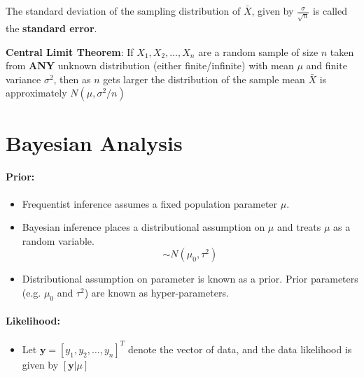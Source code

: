 \documentclass{article}
\begin{document}
The standard deviation of the sampling distribution of $\bar{X}$, given by $\frac{\sigma}{\sqrt{n}}$ is called the \textbf{standard error}.

\textbf{Central Limit Theorem}: If $X_1,X_2,\ldots,X_n$ are a random sample of size $n$ taken from \textbf{ANY} unknown distribution (either finite/infinite) with mean $\mu$ and finite variance $\sigma^2$, then as $n$ gets larger the distribution of the sample mean $\bar{X}$ is approximately $N(\mu, \sigma^2/n)$

\section{Bayesian Analysis}
\paragraph{Prior:}
\begin{itemize}
    \item Frequentist inference assumes a fixed population parameter $\mu$.
    \item Bayesian inference places a distributional assumption on $\mu$ and treats $\mu$ as a random variable.
    \begin{equation}
        [\mu]\sim N(\mu_0, \tau^2)
    \end{equation}
    \item Distributional assumption on parameter is known as a prior. Prior parameters (e.g. $\mu_0$ and $\tau^2$) are known as hyper-parameters.
\end{itemize}

\paragraph{Likelihood:}
\begin{itemize}
    \item Let $\mathbf{y} = [y_1, y_2, \ldots, y_n]^T$ denote the vector of data, and the data likelihood is given by $[\mathbf{y}|\mu]$
\end{itemize}
\end{document}
